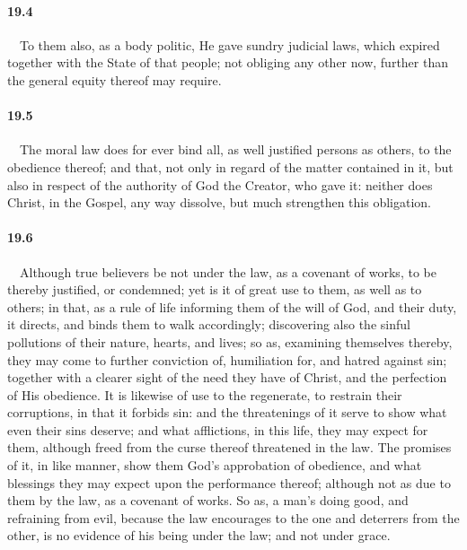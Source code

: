 \paragraph{19.4}\ \ To them also, as a body politic, He gave sundry judicial laws, which expired together with the State of that people; not obliging any other now, further than the general equity thereof may require.   
\bigskip
\paragraph{19.5}\ \ The moral law does for ever bind all, as well justified persons as others, to the obedience thereof; and that, not only in regard of the matter contained in it, but also in respect of the authority of God the Creator, who gave it: neither does Christ, in the Gospel, any way dissolve, but much strengthen this obligation.   
\bigskip
\paragraph{19.6}\ \ Although true believers be not under the law, as a covenant of works, to be thereby justified, or condemned; yet is it of great use to them, as well as to others; in that, as a rule of life informing them of the will of God, and their duty, it directs, and binds them to walk accordingly; discovering also the sinful pollutions of their nature, hearts, and lives; so as, examining themselves thereby, they may come to further conviction of, humiliation for, and hatred against sin; together with a clearer sight of the need they have of Christ, and the perfection of His obedience. It is likewise of use to the regenerate, to restrain their corruptions, in that it forbids sin: and the threatenings of it serve to show what even their sins deserve; and what afflictions, in this life, they may expect for them, although freed from the curse thereof threatened in the law. The promises of it, in like manner, show them God's approbation of obedience, and what blessings they may expect upon the performance thereof; although not as due to them by the law, as a covenant of works. So as, a man's doing good, and refraining from evil, because the law encourages to the one and deterrers from the other, is no evidence of his being under the law; and not under grace.   
\bigskip
